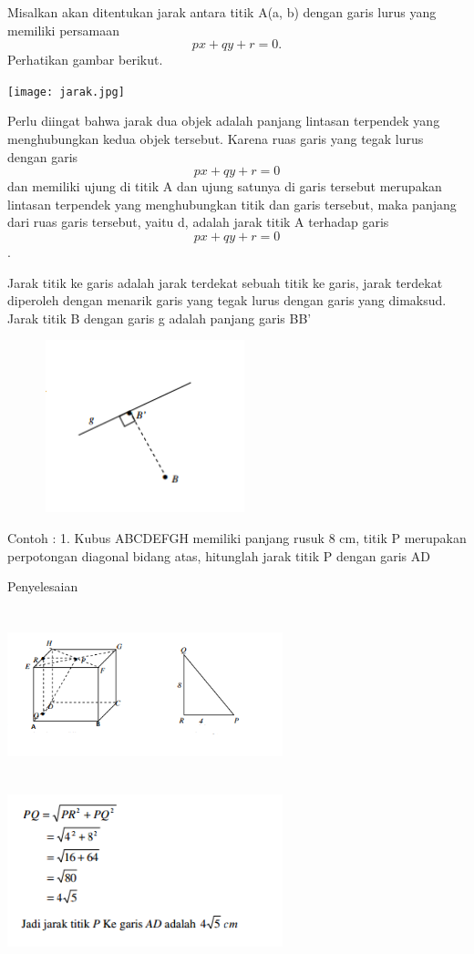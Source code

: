 \documentclass[11pt,fleqn]{book} %
\begin{document}
Misalkan akan ditentukan jarak antara titik A(a, b) dengan garis lurus yang memiliki persamaan $$px+qy+r = 0.$$ Perhatikan gambar berikut.

\begin{center}
\texttt{[image: jarak.jpg]}
\end{center}

Perlu diingat bahwa jarak dua objek adalah panjang lintasan terpendek yang menghubungkan kedua objek tersebut. Karena ruas garis yang tegak lurus dengan garis $$px+qy+r = 0$$ dan memiliki ujung di titik A dan ujung satunya di garis tersebut merupakan lintasan terpendek yang menghubungkan titik dan garis tersebut, maka panjang dari ruas garis tersebut, yaitu d, adalah jarak titik A terhadap garis $$px+qy+r = 0$$.

Jarak titik ke garis adalah jarak terdekat sebuah titik ke garis, jarak terdekat diperoleh dengan menarik garis yang tegak lurus dengan garis yang dimaksud.
Jarak titik B dengan garis g adalah panjang garis BB’  

\includegraphics[width = 8cm, height= 5cm]{Pictures/gi1.png}

Contoh :
1. Kubus ABCDEFGH memiliki panjang rusuk 8 cm, titik P merupakan perpotongan
diagonal bidang atas, hitunglah jarak titik P dengan garis AD

Penyelesaian


\includegraphics[width = 8cm, height= 5cm]{Pictures/gi2.png}
\includegraphics[width = 8cm, height= 5cm]{Pictures/gi3.png}
\end{document}
